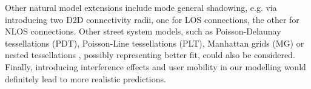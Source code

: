 \documentclass[conference]{IEEEtran}
\begin{document}
Other natural model extensions include mode general shadowing,
e.g. via introducing two D2D connectivity radii, one for LOS connections, the other for NLOS connections. Other street system models, such as Poisson-Delaunay tessellations (PDT), Poisson-Line tessellations (PLT), Manhattan grids (MG) or nested tessellations \cite{courtat_promenade_2012}, possibly representing better fit, could also be considered.
Finally, introducing interference effects and user mobility in our modelling would definitely lead to more realistic predictions.  




\end{document}
